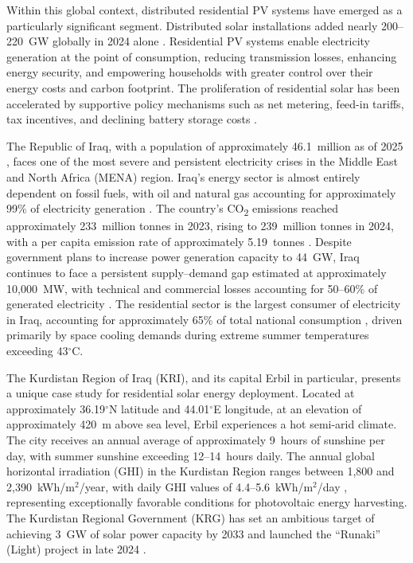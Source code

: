 Within this global context, distributed residential PV systems have emerged as a particularly significant segment. Distributed solar installations added nearly 200--220~GW globally in 2024 alone \cite{ren21_2025}. Residential PV systems enable electricity generation at the point of consumption, reducing transmission losses, enhancing energy security, and empowering households with greater control over their energy costs and carbon footprint. The proliferation of residential solar has been accelerated by supportive policy mechanisms such as net metering, feed-in tariffs, tax incentives, and declining battery storage costs \cite{rai2013,parida2011}.

The Republic of Iraq, with a population of approximately 46.1~million as of 2025 \cite{iraqcensus2025}, faces one of the most severe and persistent electricity crises in the Middle East and North Africa (MENA) region. Iraq's energy sector is almost entirely dependent on fossil fuels, with oil and natural gas accounting for approximately 99\% of electricity generation \cite{eia2024}. The country's CO\textsubscript{2} emissions reached approximately 233~million tonnes in 2023, rising to 239~million tonnes in 2024, with a per capita emission rate of approximately 5.19~tonnes \cite{worldometers2024}. Despite government plans to increase power generation capacity to 44~GW, Iraq continues to face a persistent supply--demand gap estimated at approximately 10,000~MW, with technical and commercial losses accounting for 50--60\% of generated electricity \cite{rudaw2024}. The residential sector is the largest consumer of electricity in Iraq, accounting for approximately 65\% of total national consumption \cite{iea2024}, driven primarily by space cooling demands during extreme summer temperatures exceeding 43$^{\circ}$C.

The Kurdistan Region of Iraq (KRI), and its capital Erbil in particular, presents a unique case study for residential solar energy deployment. Located at approximately 36.19$^{\circ}$N latitude and 44.01$^{\circ}$E longitude, at an elevation of approximately 420~m above sea level, Erbil experiences a hot semi-arid climate. The city receives an annual average of approximately 9~hours of sunshine per day, with summer sunshine exceeding 12--14~hours daily. The annual global horizontal irradiation (GHI) in the Kurdistan Region ranges between 1,800 and 2,390~kWh/m$^{2}$/year, with daily GHI values of 4.4--5.6~kWh/m$^{2}$/day \cite{globalsolaratlas2024}, representing exceptionally favorable conditions for photovoltaic energy harvesting. The Kurdistan Regional Government (KRG) has set an ambitious target of achieving 3~GW of solar power capacity by 2033 and launched the ``Runaki'' (Light) project in late 2024 \cite{krgmoe2024}.

